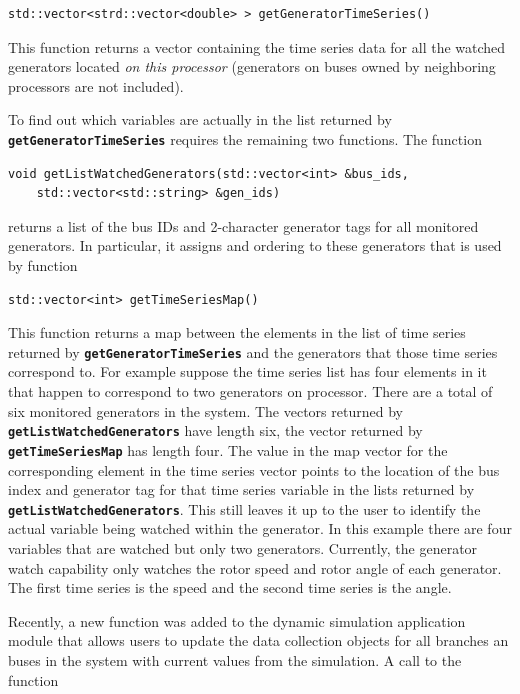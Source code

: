 {
\color{red}
\begin{Verbatim}[fontseries=b]
std::vector<strd::vector<double> > getGeneratorTimeSeries()
\end{Verbatim}
}

This function returns a vector containing the time series data for all the watched generators located \textit{on this processor} (generators on buses owned by neighboring processors are not included).

To find out which variables are actually in the list returned by \texttt{\textbf{getGeneratorTimeSeries}} requires the remaining two functions. The function

{
\color{red}
\begin{Verbatim}[fontseries=b]
void getListWatchedGenerators(std::vector<int> &bus_ids,
    std::vector<std::string> &gen_ids)
\end{Verbatim}
}

returns a list of the bus IDs and 2-character generator tags for all monitored generators. In particular, it assigns and ordering to these generators that is used by function

{
\color{red}
\begin{Verbatim}[fontseries=b]
std::vector<int> getTimeSeriesMap()
\end{Verbatim}
}

This function returns a map between the elements in the list of time series returned by \texttt{\textbf{getGeneratorTimeSeries}} and the generators that those time series correspond to. For example suppose the time series list has four elements in it that happen to correspond to two generators on processor. There are a total of six monitored generators in the system. The vectors returned by \texttt{\textbf{getListWatchedGenerators}} have length six, the vector returned by \texttt{\textbf{getTimeSeriesMap}} has length four. The value in the map vector for the corresponding element in the time series vector points to the location of the bus index and generator tag for that time series variable in the lists returned by \texttt{\textbf{getListWatchedGenerators}}. This still leaves it up to the user to identify the actual variable being watched within the generator. In this example there are four variables that are watched but only two generators. Currently, the generator watch capability only watches the rotor speed and rotor angle of each generator. The first time series is the speed and the second time series is the angle.

Recently, a new function was added to the dynamic simulation application module
that allows users to update the data collection objects for all branches an
buses in the system with current values from the simulation. A call to the
function

